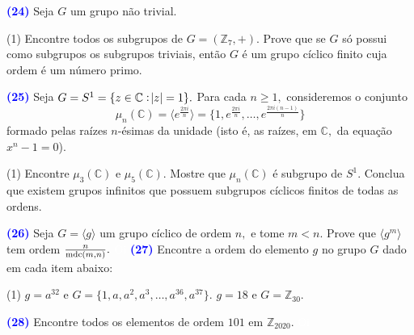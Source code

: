 \documentclass[12pt, a4paper]{article}
\newcommand{\mdc}{{\rm mdc}}
\newcommand{\negrito}[1]{\mbox{\boldmath{$#1$}}}
\begin{document}
\textcolor{blue}{\bf(24)}\label{31} Seja $G$ um grupo não trivial. 
\begin{tasks}[counter-format={(tsk[a])},label-width=3.6ex, label-format = {\bfseries}, column-sep = {0pt}](1)
\task[\textcolor{Floresta}{$\negrito{(a)} $}] Encontre todos os subgrupos de $G = (\mathbb{Z}_7, +).$
\task[\textcolor{Floresta}{$\negrito{(b)} $}] Prove que se $G$ só possui como subgrupos os subgrupos triviais, então $G$ é um grupo cíclico finito cuja ordem é um número primo.%
\end{tasks}
\textcolor{blue}{\bf(25)}\label{32} Seja $G = S^{1} = \{ z \in \mathbb{C} : \abs{z} = 1 \}.$ Para cada $n \ge 1,$ consideremos o conjunto
\[
\mu_n(\mathbb{C}) = \langle e^{\frac{2 \pi i}{n}} \rangle = \{1, e^{\frac{2 \pi i}{n}}, \ldots, e^{\frac{2 \pi i (n-1)}{n}} \}
\]
formado pelas raízes $n$-ésimas da unidade (isto é, as raízes, em $\mathbb{C},$ da equação $x^n - 1 = 0$).
\begin{tasks}[counter-format={(tsk[a])},label-width=3.6ex, label-format = {\bfseries}, column-sep = {0pt}](1)
\task[\textcolor{Floresta}{$\negrito{(a)} $}] Encontre $\mu_3(\mathbb{C})$ e $\mu_5(\mathbb{C}).$
\task[\textcolor{Floresta}{$\negrito{(b)} $}] Mostre que $\mu_n(\mathbb{C})$ é subgrupo de $S^1.$
\task[\textcolor{Floresta}{$\negrito{(c)} $}] Conclua que existem grupos infinitos que possuem subgrupos cíclicos finitos de todas as ordens.
\end{tasks}
\textcolor{blue}{\bf(26)}\label{ex4} Seja $G = \langle g \rangle$ um grupo cíclico de ordem $n,$ e tome $m < n.$ Prove que $\langle g^m \rangle$ tem ordem $\frac{n}{\mdc(m,n)}.$
\textcolor{white}{Oi}\newline\newline
\textcolor{blue}{\bf(27)}\label{ex5} Encontre a ordem do elemento $g$ no grupo $G$ dado em cada item abaixo:
\begin{tasks}[counter-format={(tsk[a])},label-width=3.6ex, label-format = {\bfseries}, column-sep = {0pt}](1)
\task[\textcolor{Floresta}{$\negrito{(a)} $}] $g = a^{32}$ e $G = \{1, a, a^2, a^3, \ldots, a^{36}, a^{37} \}.$
\task[\textcolor{Floresta}{$\negrito{(b)} $}] $g = 18$ e $G = \mathbb{Z}_{30}.$
\end{tasks}
\textcolor{blue}{\bf(28)}\label{ex6} Encontre todos os elementos de ordem $101$ em $\mathbb{Z}_{2020}.$ %
\textcolor{white}{Oi}\newline\newline
\end{document}
